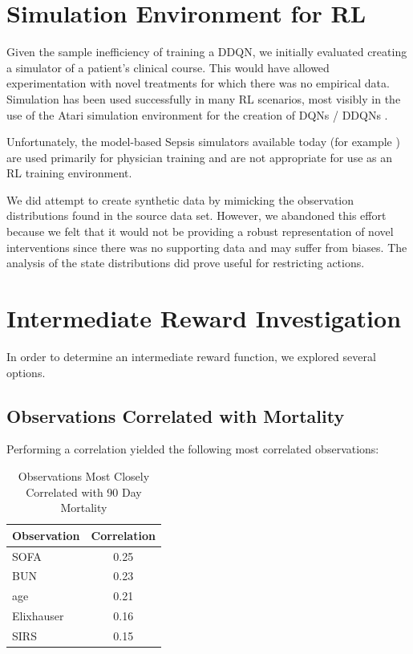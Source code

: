 \documentclass[letterpaper]{article}
\begin{document}
\newpage
\begin{appendices}

\section{Simulation Environment for RL}

Given the sample inefficiency of training a DDQN, we initially evaluated creating a simulator
of a patient's clinical course. This would have allowed experimentation with novel treatments
for which there was no empirical data. Simulation has been used successfully in many RL 
scenarios, most visibly in the use of the Atari simulation 
environment \cite{DBLP:journals/corr/abs-1207-4708} for the creation of DQNs \cite{DBLP:journals/corr/MnihKSGAWR13} 
/ DDQNs \cite{wang2015dueling}.

Unfortunately, the model-based Sepsis simulators available today (for example \cite{breuer2004intensive}) are used primarily for physician
training and are not appropriate for use as an RL training environment. 

We did attempt to create synthetic data by mimicking the observation distributions found in the source
data set. However, we abandoned this effort because we felt that it would not be providing a robust
representation of novel interventions since there was no supporting data and may suffer from biases.
The analysis of the state distributions did prove useful for restricting actions.

\section{Intermediate Reward Investigation}
\label{appendixintermediate}
In order to determine an intermediate reward function, we explored several options. 

\subsection{Observations Correlated with Mortality}

Performing a correlation yielded the following most correlated observations:
\begin{table}[H]
\caption{Observations Most Closely Correlated with 90 Day Mortality}
\centering
\begin{tabular}{|l|c|}
\hline
Observation & Correlation \\ \hline
SOFA & 0.25 \\ 
BUN & 0.23 \\ 
age & 0.21 \\ 
Elixhauser & 0.16 \\
SIRS & 0.15 \\
\hline
\end{tabular}
\end{table}


\end{appendices}
\end{document}
